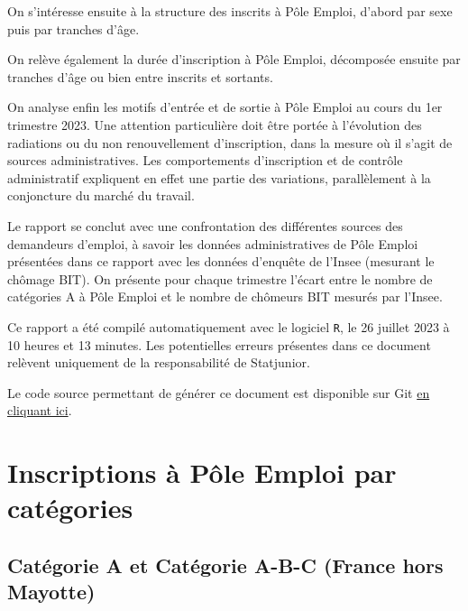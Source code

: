 \documentclass[
  paper=a4,
  ,captions=tableheading
]{scrartcl}
\begin{document}
On s'intéresse ensuite à la structure des inscrits à Pôle Emploi,
d'abord par sexe puis par tranches d'âge.

On relève également la durée d'inscription à Pôle Emploi, décomposée
ensuite par tranches d'âge ou bien entre inscrits et sortants.

On analyse enfin les motifs d'entrée et de sortie à Pôle Emploi au cours
du 1er trimestre 2023. Une attention particulière doit être portée à
l'évolution des radiations ou du non renouvellement d'inscription, dans
la mesure où il s'agit de sources administratives. Les comportements
d'inscription et de contrôle administratif expliquent en effet une
partie des variations, parallèlement à la conjoncture du marché du
travail.

Le rapport se conclut avec une confrontation des différentes sources des
demandeurs d'emploi, à savoir les données administratives de Pôle Emploi
présentées dans ce rapport avec les données d'enquête de l'Insee
(mesurant le chômage BIT). On présente pour chaque trimestre l'écart
entre le nombre de catégories A à Pôle Emploi et le nombre de chômeurs
BIT mesurés par l'Insee.

Ce rapport a été compilé automatiquement avec le logiciel \texttt{R}, le
26 juillet 2023 à 10 heures et 13 minutes. Les potentielles erreurs
présentes dans ce document relèvent uniquement de la responsabilité de
Statjunior.

Le code source permettant de générer ce document est disponible sur Git
\href{https://github.com/statjunior/Statjunior/tree/main/Demandeurs\%20d\textquotesingle{}emploi\%20(Pôle\%20Emploi)/}{en
cliquant ici}.

\hypertarget{inscriptions-uxe0-puxf4le-emploi-par-catuxe9gories}{%
\section{Inscriptions à Pôle Emploi par
catégories}\label{inscriptions-uxe0-puxf4le-emploi-par-catuxe9gories}}

\hypertarget{catuxe9gorie-a-et-catuxe9gorie-a-b-c-france-hors-mayotte}{%
\subsection{Catégorie A et Catégorie A-B-C (France hors
Mayotte)}\label{catuxe9gorie-a-et-catuxe9gorie-a-b-c-france-hors-mayotte}}
\end{document}
